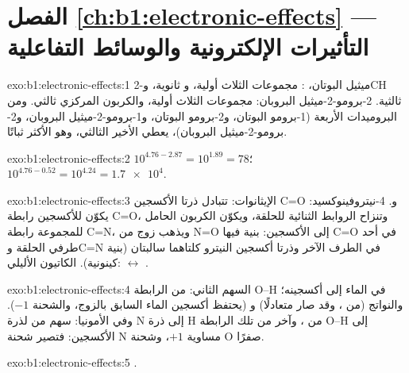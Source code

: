 \section*{الفصل \ref{ch:b1:electronic-effects} --- التأثيرات الإلكترونية والوسائط التفاعلية}

\begin{solution}{exo:b1:electronic-effects:1}
2-ميثيل البوتان، : مجموعات  الثلاث أولية،
و ثانوية، وCH ثالثية. 2-برومو-2-ميثيل البروبان: مجموعات
 الثلاث أولية، والكربون المركزي ثالثي. ومن البروميدات الأربعة
 (1-برومو البوتان، و2-برومو البوتان، و1-برومو-2-ميثيل البروبان،
و2-برومو-2-ميثيل البروبان)، يعطي الأخير  الثالثي، وهو
الأكثر ثباتًا.
\end{solution}

\begin{solution}{exo:b1:electronic-effects:2}
$10^{4.76 - 2.87} = 10^{1.89} = 78$؛ $10^{4.76 - 0.52} = 10^{4.24} =
\num{1.7e4}$.
\end{solution}

\begin{solution}{exo:b1:electronic-effects:3}
الإيثانوات: تتبادل ذرتا الأكسجين C=O و.
4-نيتروفينوكسيد: يكوّن  للأكسجين رابطة C=O، وتنزاح الروابط الثنائية للحلقة،
ويكوّن الكربون الحامل للمجموعة  رابطة C=N، ويذهب زوج من N=O
إلى الأكسجين: بنية فيها C=O في أحد طرفي الحلقة وC=N في الطرف الآخر
وذرتا أكسجين النيترو كلتاهما سالبتان (بنية كينونية). الكاتيون الأليلي:
 $\leftrightarrow$ .
\end{solution}

\begin{solution}{exo:b1:electronic-effects:4}
السهم الثاني: من الرابطة O--H في الماء إلى أكسجينه؛ والنواتج 
(من ، وقد صار متعادلًا) و (يحتفظ أكسجين الماء السابق
بالزوج، والشحنة $-1$). وفي الأمونيا: سهم من  لذرة N إلى
ذرة H من ، وآخر من تلك الرابطة O--H إلى الأكسجين: فتصير شحنة N
مساوية $+1$، وشحنة O صفرًا.
\end{solution}

\begin{solution}{exo:b1:electronic-effects:5}
.
\end{solution}

